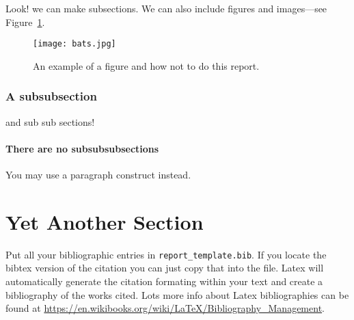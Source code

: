 \documentclass[11pt]{article}
\theoremstyle{nonumberplain}
\begin{document}
Look! we can make subsections.  We can also include figures and
images---see Figure~\ref{fig:bats}.

\begin{figure}[t] %
  \texttt{[image: bats.jpg]}
  \caption{An example of a figure and how not to do this report.}
  \label{fig:bats} %
\end{figure}

\subsubsection{A subsubsection}

and sub sub sections!

\paragraph{There are no subsubsubsections}

You may use a paragraph construct instead.

\section{Yet Another Section}

Put all your bibliographic entries in \texttt{report\_template.bib}.
If you locate the bibtex version of the citation you can just copy
that into the file.  Latex will automatically generate the citation
formating within your text and create a bibliography of the works
cited.  Lots more info about Latex bibliographies can be found at
\url{https://en.wikibooks.org/wiki/LaTeX/Bibliography_Management}.


\end{document}
